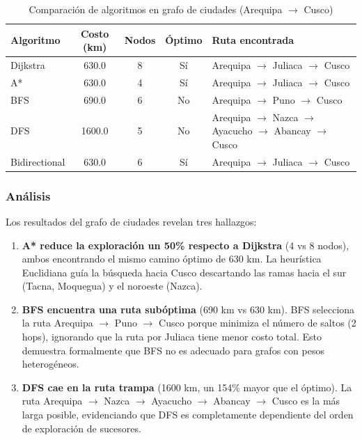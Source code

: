 \begin{table}[H]
\centering
\caption{Comparación de algoritmos en grafo de ciudades (Arequipa $\rightarrow$ Cusco)}
\label{tab:graph_results}
\renewcommand{\arraystretch}{1.3}
\begin{tabular}{@{}lcccp{5cm}@{}}
\toprule
\textbf{Algoritmo} & \textbf{Costo (km)} & \textbf{Nodos} & \textbf{Óptimo} & \textbf{Ruta encontrada} \\
\midrule
Dijkstra & 630.0 & 8 & Sí & Arequipa $\rightarrow$ Juliaca $\rightarrow$ Cusco \\
A* & 630.0 & 4 & Sí & Arequipa $\rightarrow$ Juliaca $\rightarrow$ Cusco \\
BFS & 690.0 & 6 & No & Arequipa $\rightarrow$ Puno $\rightarrow$ Cusco \\
DFS & 1600.0 & 5 & No & Arequipa $\rightarrow$ Nazca $\rightarrow$ Ayacucho $\rightarrow$ Abancay $\rightarrow$ Cusco \\
Bidirectional & 630.0 & 6 & Sí & Arequipa $\rightarrow$ Juliaca $\rightarrow$ Cusco \\
\bottomrule
\end{tabular}
\end{table}

\subsubsection{Análisis}

Los resultados del grafo de ciudades revelan tres hallazgos:

\begin{enumerate}
    \item \textbf{A* reduce la exploración un 50\% respecto a Dijkstra} (4 vs 8 nodos), ambos encontrando el mismo camino óptimo de 630 km. La heurística Euclidiana guía la búsqueda hacia Cusco descartando las ramas hacia el sur (Tacna, Moquegua) y el noroeste (Nazca).

    \item \textbf{BFS encuentra una ruta subóptima} (690 km vs 630 km). BFS selecciona la ruta Arequipa $\rightarrow$ Puno $\rightarrow$ Cusco porque minimiza el número de saltos (2 hops), ignorando que la ruta por Juliaca tiene menor costo total. Esto demuestra formalmente que BFS no es adecuado para grafos con pesos heterogéneos.

    \item \textbf{DFS cae en la ruta trampa} (1600 km, un 154\% mayor que el óptimo). La ruta Arequipa $\rightarrow$ Nazca $\rightarrow$ Ayacucho $\rightarrow$ Abancay $\rightarrow$ Cusco es la más larga posible, evidenciando que DFS es completamente dependiente del orden de exploración de sucesores.
\end{enumerate}

